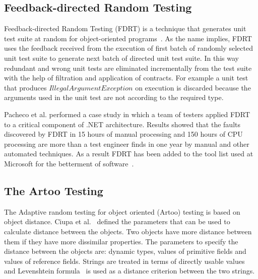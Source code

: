 
\subsection{Feedback-directed Random Testing}
Feedback-directed Random Testing (FDRT) is a technique that generates unit test suite at random for object-oriented programs~\cite{pacheco2007randoop}. As the name implies, FDRT uses the feedback received from the execution of first batch of randomly selected unit test suite to generate next batch of directed unit test suite. In this way redundant  and wrong unit tests are eliminated incrementally from the test suite with the help of filtration and application of contracts. For example a unit test that produces $IllegalArgumentException$ on execution is discarded because the arguments used in the unit test are not according to the required type. 

Pacheco et al. performed a case study in which a team of testers applied FDRT to a critical component of .NET architecture. Results showed that the faults discovered by FDRT in 15 hours of manual processing and 150 hours of CPU processing are more than a test engineer finds in one year by manual and other automated techniques. As a result FDRT has been added to the tool list used at Microsoft for the betterment of software~\cite{qualitypacheco2008finding}. 



\subsection{The Artoo Testing}
The Adaptive random testing for object oriented (Artoo) testing is based on object distance. Ciupa et al.~\cite{ciupa2006object} defined the parameters that can be used to calculate distance between the objects. Two objects have more distance between them if they have more dissimilar properties. The parameters to specify the distance between the objects are: dynamic types, values of primitive fields and values of reference fields. Strings are treated in terms of directly usable values and Levenshtein formula~\cite{levenshtein1966binary} is used as a distance criterion between the two strings.

